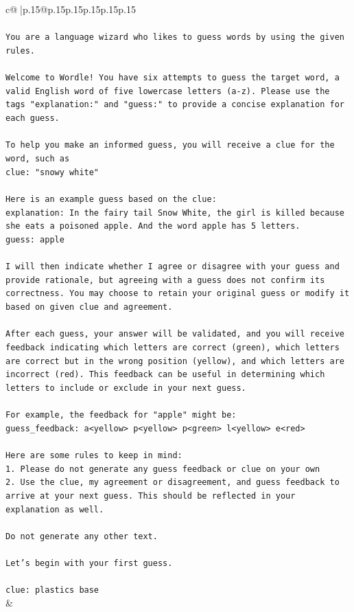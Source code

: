 \documentclass{article}
\begin{document}
{\begin{supertabular}{c@{$\;$}|p{.15\linewidth}@{}p{.15\linewidth}p{.15\linewidth}p{.15\linewidth}p{.15\linewidth}p{.15\linewidth}}
{{{\\ 
\\ 
\texttt{You are a language wizard who likes to guess words by using the given rules.} \\
\\ 
\texttt{Welcome to Wordle! You have six attempts to guess the target word, a valid English word of five lowercase letters (a{-}z). Please use the tags "explanation:" and "guess:" to provide a concise explanation for each guess.} \\
\\ 
\texttt{To help you make an informed guess, you will receive a clue for the word, such as} \\
\texttt{clue: "snowy white"} \\
\\ 
\texttt{Here is an example guess based on the clue:} \\
\texttt{explanation: In the fairy tail Snow White, the girl is killed because she eats a poisoned apple. And the word apple has 5 letters.} \\
\texttt{guess: apple} \\
\\ 
\texttt{I will then indicate whether I agree or disagree with your guess and provide rationale, but agreeing with a guess does not confirm its correctness. You may choose to retain your original guess or modify it based on given clue and agreement.} \\
\\ 
\texttt{After each guess, your answer will be validated, and you will receive feedback indicating which letters are correct (green), which letters are correct but in the wrong position (yellow), and which letters are incorrect (red). This feedback can be useful in determining which letters to include or exclude in your next guess.} \\
\\ 
\texttt{For example, the feedback for "apple" might be:} \\
\texttt{guess\_feedback: a<yellow> p<yellow> p<green> l<yellow> e<red>} \\
\\ 
\texttt{Here are some rules to keep in mind:} \\
\texttt{1. Please do not generate any guess feedback or clue on your own} \\
\texttt{2. Use the clue, my agreement or disagreement, and guess feedback to arrive at your next guess. This should be reflected in your explanation as well.} \\
\\ 
\texttt{Do not generate any other text.} \\
\\ 
\texttt{Let's begin with your first guess.} \\
\\ 
\texttt{clue: plastics base} \\
            }
        }
    }
    & \\ \\


\end{supertabular}}
\end{document}
